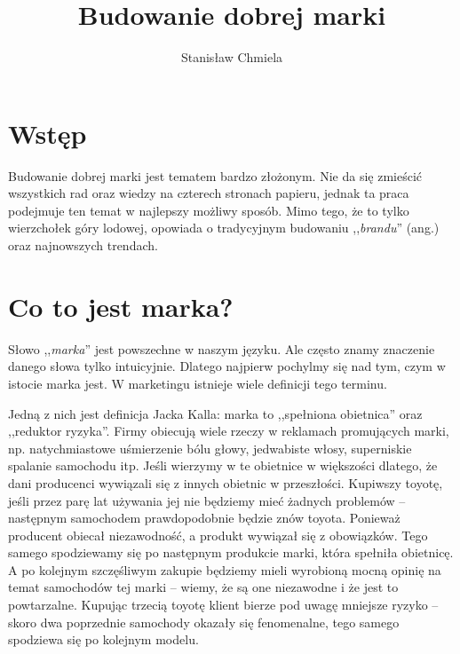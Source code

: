 \documentclass [a4paper, 11pt]{article}
\author{Stanisław Chmiela}
\title{Budowanie dobrej marki}
\begin{document}
\maketitle
\tableofcontents
\clearpage
\section{Wstęp}
Budowanie dobrej marki jest tematem bardzo złożonym. Nie da się zmieścić wszystkich rad oraz wiedzy na czterech stronach papieru, jednak ta praca podejmuje ten temat w najlepszy możliwy sposób. Mimo tego, że to tylko wierzchołek góry lodowej, opowiada o tradycyjnym budowaniu ,,\emph{brandu}'' (ang.) oraz najnowszych trendach.

\section{Co to jest marka?}
Słowo ,,\emph{marka}'' jest powszechne w naszym języku. Ale często znamy znaczenie danego słowa tylko intuicyjnie. Dlatego najpierw pochylmy się nad tym, czym w istocie marka jest. W marketingu istnieje wiele definicji tego terminu.

Jedną z nich jest definicja Jacka Kalla\cite{kall}: marka to ,,spełniona obietnica'' oraz ,,reduktor ryzyka''. Firmy obiecują wiele rzeczy w reklamach promujących marki, np. natychmiastowe uśmierzenie bólu głowy, jedwabiste włosy, superniskie spalanie samochodu itp. Jeśli wierzymy w te obietnice w większości dlatego, że dani producenci wywiązali się z innych obietnic w przeszłości. Kupiwszy toyotę, jeśli przez parę lat używania jej nie będziemy mieć żadnych problemów -- następnym samochodem prawdopodobnie będzie znów toyota. Ponieważ producent obiecał niezawodność, a produkt wywiązał się z obowiązków. Tego samego spodziewamy się po następnym produkcie marki, która spełniła obietnicę. A po kolejnym szczęśliwym zakupie będziemy mieli wyrobioną mocną opinię na temat samochodów tej marki -- wiemy, że są one niezawodne i że jest to powtarzalne. Kupując trzecią toyotę klient bierze pod uwagę mniejsze ryzyko -- skoro dwa poprzednie samochody okazały się fenomenalne, tego samego spodziewa się po kolejnym modelu.
\end{document}
